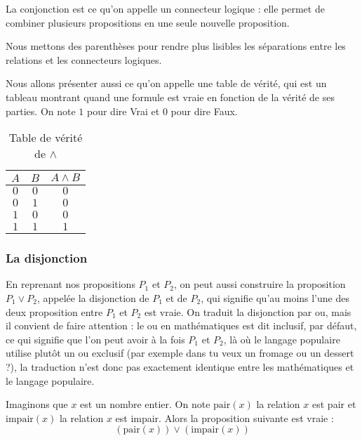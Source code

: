 La conjonction est ce qu'on appelle un connecteur logique :  elle permet de combiner plusieurs propositions en une seule nouvelle proposition.

Nous mettons des parenthèses pour rendre plus lisibles les séparations entre les relations et les connecteurs logiques.

Nous allons présenter aussi ce qu'on appelle une table de vérité, qui est un tableau montrant quand une formule est vraie en fonction de la vérité de ses parties. On note $1$ pour dire \og Vrai\fg{} et $0$ pour dire \og Faux\fg{}.

\begin{table}[h]
            \centering
            \begin{tabular}{| c | c | c |}
                \hline
                $A$ & $B$ & $A\land B$\\
                \hline
                $0$ & $0$ & $0$\\
                $0$ & $1$ & $0$\\
                $1$ & $0$ & $0$\\
                $1$ & $1$ & $1$\\
                \hline
            \end{tabular}
            \caption{Table de vérité de $\land$}
    \end{table}

\subsubsection{La disjonction}

En reprenant nos propositions $P_1$ et $P_2$, on peut aussi construire la proposition $P_1\lor P_2$, appelée la disjonction de $P_1$ et de $P_2$, qui signifie qu'au moins l'une des deux proposition entre $P_1$ et $P_2$ est vraie. On traduit la disjonction par \og ou\fg{}, mais il convient de faire attention : le \og ou\fg{} en mathématiques est dit inclusif, par défaut, ce qui signifie que l'on peut avoir à la fois $P_1$ et $P_2$, là où le langage populaire utilise plutôt un \og ou\fg{} exclusif (par exemple dans \og tu veux un fromage ou un dessert ?\fg{}), la traduction n'est donc pas exactement identique entre les mathématiques et le langage populaire.

\begin{expl}
    Imaginons que $x$ est un nombre entier. On note $\mathrm{pair}(x)$ la relation \og $x$ est pair\fg{} et $\mathrm{impair}(x)$ la relation \og $x$ est impair\fg{}. Alors la proposition suivante est vraie :
    $$(\mathrm{pair}(x))\lor (\mathrm{impair}(x))$$
\end{expl}

